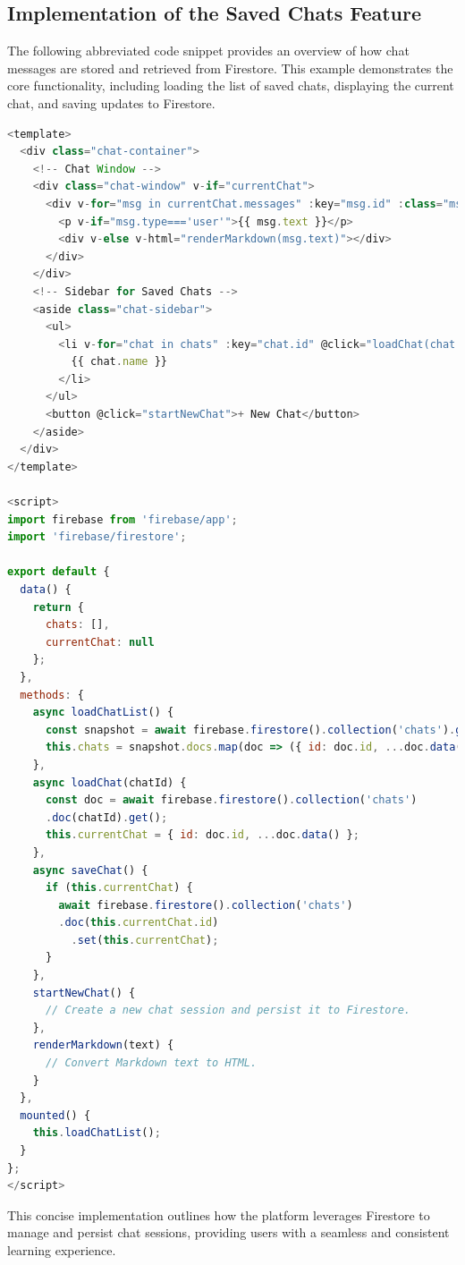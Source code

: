 \subsection{Implementation of the Saved Chats Feature}

The following abbreviated code snippet provides an overview of how chat messages are stored and retrieved from Firestore. This example demonstrates the core functionality, including loading the list of saved chats, displaying the current chat, and saving updates to Firestore.

\begin{lstlisting}[language=JavaScript, caption={Abbreviated Implementation of the Saved Chats Feature}, frame=single]
<template>
  <div class="chat-container">
    <!-- Chat Window -->
    <div class="chat-window" v-if="currentChat">
      <div v-for="msg in currentChat.messages" :key="msg.id" :class="msg.type">
        <p v-if="msg.type==='user'">{{ msg.text }}</p>
        <div v-else v-html="renderMarkdown(msg.text)"></div>
      </div>
    </div>
    <!-- Sidebar for Saved Chats -->
    <aside class="chat-sidebar">
      <ul>
        <li v-for="chat in chats" :key="chat.id" @click="loadChat(chat.id)">
          {{ chat.name }}
        </li>
      </ul>
      <button @click="startNewChat">+ New Chat</button>
    </aside>
  </div>
</template>

<script>
import firebase from 'firebase/app';
import 'firebase/firestore';

export default {
  data() {
    return {
      chats: [],
      currentChat: null
    };
  },
  methods: {
    async loadChatList() {
      const snapshot = await firebase.firestore().collection('chats').get();
      this.chats = snapshot.docs.map(doc => ({ id: doc.id, ...doc.data() }));
    },
    async loadChat(chatId) {
      const doc = await firebase.firestore().collection('chats')
      .doc(chatId).get();
      this.currentChat = { id: doc.id, ...doc.data() };
    },
    async saveChat() {
      if (this.currentChat) {
        await firebase.firestore().collection('chats')
        .doc(this.currentChat.id)
          .set(this.currentChat);
      }
    },
    startNewChat() {
      // Create a new chat session and persist it to Firestore.
    },
    renderMarkdown(text) {
      // Convert Markdown text to HTML.
    }
  },
  mounted() {
    this.loadChatList();
  }
};
</script>
\end{lstlisting}

This concise implementation outlines how the platform leverages Firestore to manage and persist chat sessions, providing users with a seamless and consistent learning experience.

